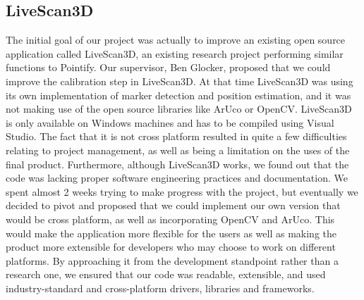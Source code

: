 \documentclass{article}
\begin{document}
\subsection{LiveScan3D}
The initial goal of our project was actually to improve an existing open source application called LiveScan3D, an existing research project performing similar functions to Pointify. Our supervisor, Ben Glocker, proposed that we could improve the calibration step in LiveScan3D. At that time LiveScan3D was using its own implementation of marker detection and position estimation, and it was not making use of the open source libraries like ArUco or OpenCV. LiveScan3D is only available on Windows machines and has to be compiled using Visual Studio. The fact that it is not cross platform resulted in quite a few difficulties relating to project management, as well as being a limitation on the uses of the final product. Furthermore, although LiveScan3D works, we found out that the code was lacking proper software engineering practices and documentation. We spent almost 2 weeks trying to make progress with the project, but eventually we decided to pivot and proposed that we could implement our own version that would be cross platform, as well as incorporating OpenCV and ArUco. This would make the application more flexible for the users as well as making the product more extensible for developers who may choose to work on different platforms. By approaching it from the development standpoint rather than a research one, we ensured that our code was readable, extensible, and used industry-standard and cross-platform drivers, libraries and frameworks.
\end{document}
